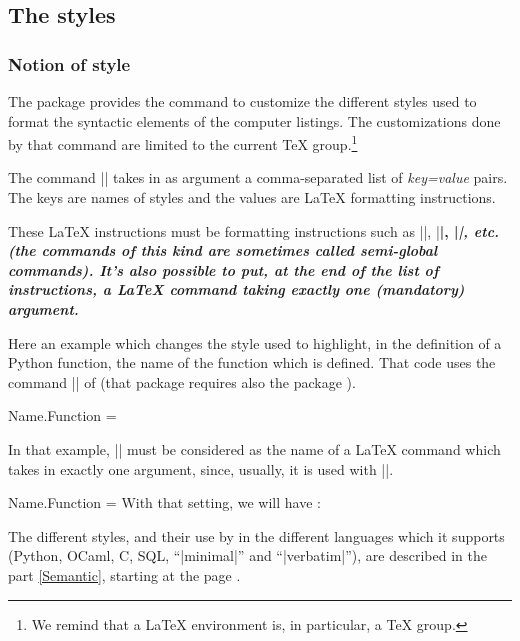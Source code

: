 \documentclass{article}
\begin{document}
\subsection{The styles}

\label{styles}

\subsubsection{Notion of style}

The package  provides the command
 to customize the different styles used to
format the syntactic elements of the computer listings. The customizations done
by that command are limited to the current TeX group.\footnote{We remind that
a LaTeX environment is, in particular, a TeX group.}

\bigskip
{}
The command |\SetPitonStyle| takes in as argument a comma-separated list of
\textsl{key=value} pairs. The keys are names of styles and the values are LaTeX
formatting instructions.

\bigskip
These LaTeX instructions must be formatting instructions such as
|\color{ }|, |\bfseries|, |\slshape|, etc. (the commands of this kind are
sometimes called \emph{semi-global} commands). It's also possible to put,
\emph{at the end of the list of instructions}, a LaTeX command taking exactly
one (mandatory) argument.

\bigskip
Here an example which changes the style used to highlight, in the definition
of a Python function, the name of the function which is defined. That code
uses the command |\highLight| of  (that package requires also the
package ).

\begin{Code}
\SetPitonStyle
  { Name.Function = \bfseries \highLight[red!30] }
\end{Code}

In that example, |\highLight[red!30]| must be considered as the name of a
LaTeX command which takes in exactly one argument, since, usually, it is used
with ||.

\medskip
\begingroup
\SetPitonStyle 
  { Name.Function = \bfseries \highLight[red!30] }
With that setting, we will have : 
\endgroup

\bigskip
The different styles, and their use by  in the different languages
which it supports (Python, OCaml, C, SQL, ``|minimal|'' and ``|verbatim|''),
are described in the part \ref{Semantic}, starting at the page
\pageref{Semantic}.  
\end{document}
